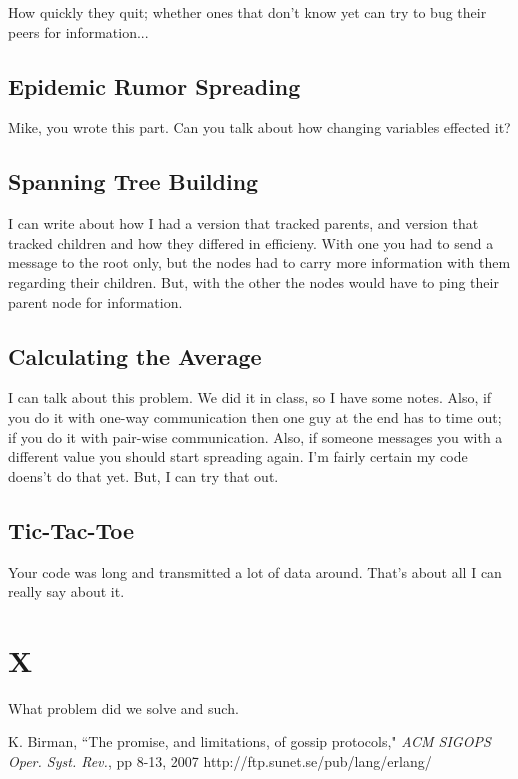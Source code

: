\documentclass[11pt,twocolumn]{article}
\begin{document}
How quickly they quit; whether ones that don't 
know yet can try to bug their peers for information...

\subsection{Epidemic Rumor Spreading}

Mike, you wrote this part.  Can you talk about how changing variables effected
it?

\subsection{Spanning Tree Building}

I can write about how I had a version that tracked parents, and version that 
tracked children and how they differed in efficieny.  With one you had to
send a message to the root only, but the nodes had to carry more information
with them regarding their children.  But, with the other the nodes would have
to ping their parent node for information.

\subsection{Calculating the Average}

I can talk about this problem.  We did it in class, so I have some notes.  Also,
if you do it with one-way communication then one guy at the end has to time out;
if you do it with pair-wise communication.  Also, if someone messages you with
 a different value you should start spreading again.  I'm fairly certain my 
code doens't do that yet.  But, I can try that out.

\subsection{Tic-Tac-Toe}

Your code was long and transmitted a lot of data around.  That's about all I can
 really say about it.

\section{X}

What problem did we solve and such.

\begin{thebibliography}{10}
K. Birman, ``The promise, and limitations, of gossip protocols," \emph{ACM SIGOPS Oper. Syst. Rev.}, pp 8-13, 2007
http://ftp.sunet.se/pub/lang/erlang/
\end{thebibliography}
\end{document}
